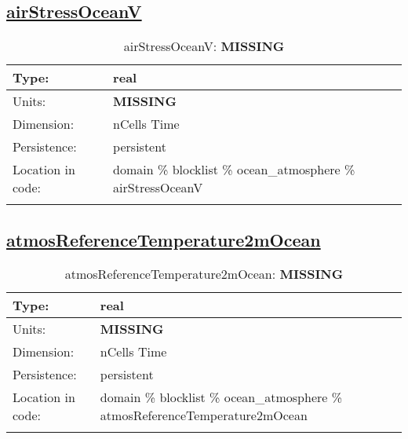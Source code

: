 \subsection[airStressOceanV]{\hyperref[sec:var_tab_ocean_atmosphere]{airStressOceanV}}
\label{subsec:var_sec_ocean_atmosphere_airStressOceanV}
\begin{center}
\begin{longtable}{| p{2.0in} | p{4.0in} |}
        \hline 
        Type: & real \\
        \hline 
        Units: & {\bf \color{red} MISSING} \\
        \hline 
        Dimension: & nCells Time \\
        \hline 
        Persistence: & persistent \\
        \hline 
         Location in code: & domain \% blocklist \% ocean\_atmosphere \% airStressOceanV \\
         \hline 
    \caption{airStressOceanV: {\bf \color{red} MISSING}}
\end{longtable}
\end{center}
\subsection[atmosReferenceTemperature2mOcean]{\hyperref[sec:var_tab_ocean_atmosphere]{atmosReferenceTemperature2mOcean}}
\label{subsec:var_sec_ocean_atmosphere_atmosReferenceTemperature2mOcean}
\begin{center}
\begin{longtable}{| p{2.0in} | p{4.0in} |}
        \hline 
        Type: & real \\
        \hline 
        Units: & {\bf \color{red} MISSING} \\
        \hline 
        Dimension: & nCells Time \\
        \hline 
        Persistence: & persistent \\
        \hline 
         Location in code: & domain \% blocklist \% ocean\_atmosphere \% atmosReferenceTemperature2mOcean \\
         \hline 
    \caption{atmosReferenceTemperature2mOcean: {\bf \color{red} MISSING}}
\end{longtable}
\end{center}
